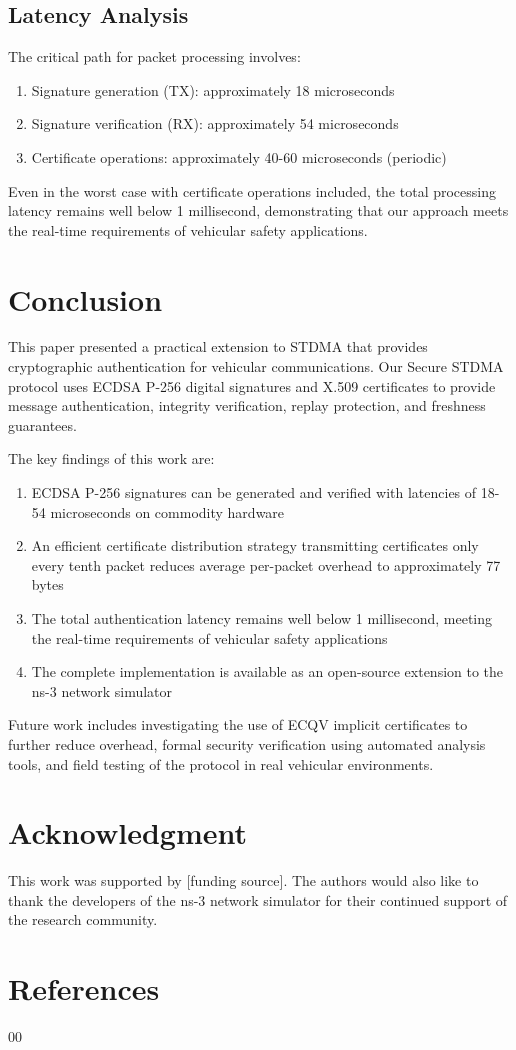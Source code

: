 \documentclass[conference]{IEEEtran}
\begin{document}
\subsection{Latency Analysis}

The critical path for packet processing involves:
\begin{enumerate}
    \item Signature generation (TX): approximately 18 microseconds
    \item Signature verification (RX): approximately 54 microseconds
    \item Certificate operations: approximately 40-60 microseconds (periodic)
\end{enumerate}

Even in the worst case with certificate operations included, the total processing latency remains well below 1 millisecond, demonstrating that our approach meets the real-time requirements of vehicular safety applications.

\section{Conclusion}
\label{sec:conclusion}

This paper presented a practical extension to STDMA that provides cryptographic authentication for vehicular communications. Our Secure STDMA protocol uses ECDSA P-256 digital signatures and X.509 certificates to provide message authentication, integrity verification, replay protection, and freshness guarantees.

The key findings of this work are:
\begin{enumerate}
    \item ECDSA P-256 signatures can be generated and verified with latencies of 18-54 microseconds on commodity hardware
    \item An efficient certificate distribution strategy transmitting certificates only every tenth packet reduces average per-packet overhead to approximately 77 bytes
    \item The total authentication latency remains well below 1 millisecond, meeting the real-time requirements of vehicular safety applications
    \item The complete implementation is available as an open-source extension to the ns-3 network simulator
\end{enumerate}

Future work includes investigating the use of ECQV implicit certificates to further reduce overhead, formal security verification using automated analysis tools, and field testing of the protocol in real vehicular environments.

\section*{Acknowledgment}

This work was supported by [funding source]. The authors would also like to thank the developers of the ns-3 network simulator for their continued support of the research community.

\section*{References}

\begin{thebibliography}{00}

\end{thebibliography}
\end{document}
